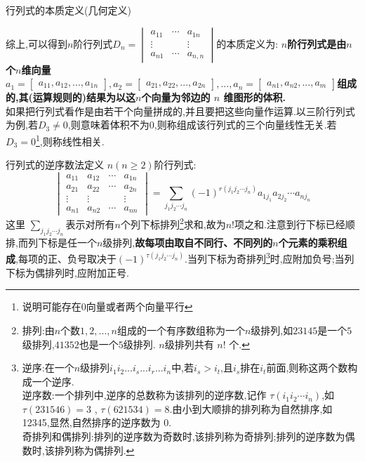 \documentclass[8pt a4paper, oneside, UTF8]{ctexbook}
\begin{document}
\begin{sloppypar}
\begin{defn}{行列式的本质定义(几何定义)}{}
\begin{center}
    \end{center}
    综上,可以得到$n$阶行列式$D_n=
    \begin{vmatrix}
        a_{11} & \cdots &a_{1n}\\ 
        \vdots &        & \vdots\\
        a_{n1} & \cdots & a_{n,n}
    \end{vmatrix}$的本质定义为:
    \textbf{$n$阶行列式是由$n$个$n$维向量$a_1=\begin{bmatrix}a_{11},a_{12},...,a_{1n}\end{bmatrix},a_2=\begin{bmatrix}a_{21},a_{22},...,a_{2n}\end{bmatrix},...,a_n=\begin{bmatrix}a_{n1},a_{n2},...,a_m\end{bmatrix}$组成的,其(运算规则的)结果为以这$n$个向量为邻边的 $n$ 维图形的体积.}\\
    如果把行列式看作是由若干个向量拼成的,并且要把这些向量作运算.以三阶行列式为例,若$D_3 \neq 0$,则意味着体积不为0,则称组成该行列式的三个向量线性无关.若$D_3 =0$\footnote{说明可能存在0向量或者两个向量平行},则称线性相关.
    \end{defn}
    \begin{defn}{行列式的逆序数法定义}{}
    $n(n\geqslant2)$阶行列式:$$\begin{vmatrix}a_{11}&a_{12}&\cdots&a_{1n}\\a_{21}&a_{22}&\cdots&a_{2n}\\\vdots&\vdots&&\vdots\\a_{n1}&a_{n2}&\cdots&a_{nn}\end{vmatrix}=\sum_{j_{1}j_{2}\cdots j_{n}}(-1)^{r(j_{1}j_{2}\cdots j_{n})}a_{1j_{1}}a_{2j_{2}}\cdots a_{nj_{n}}$$
    这里 $\sum_{j_1j_2\cdots j_n} $表示对所有$n$个列下标排列\footnote{排列:由$n$个数$1,2,...,n$组成的一个有序数组称为一个$n$级排列,如$23145$是一个$5$级排列,$41352$也是一个$5$级排列. $n$级排列共有 $n!$ 个.}求和,故为$n!$项之和.注意到行下标已经顺排,而列下标是任一个$n$级排列,\textbf{故每项由取自不同行、不同列的$n$个元素的乘积组成},每项的正、负号取决于$(-1)^{\tau(j_1j_2\cdots j_n)}$.当列下标为奇排列\footnote{逆序:在一个$n$级排列$i_1i_2...i_s...i_r...i_n$中,若$i_s>i_t$,且$i_{s}$排在$i_{t}$前面,则称这两个数构成一个逆序.\\逆序数:一个排列中,逆序的总数称为该排列的逆序数,记作 $\tau(i_1i_2\cdots i_n)$,如 $\tau(231546)=3$ , $\tau(621534)=8$.由小到大顺排的排列称为自然排序,如 12345,显然,自然排序的逆序数为 0.\\奇排列和偶排列:排列的逆序数为奇数时,该排列称为奇排列;排列的逆序数为偶数时,该排列称为偶排列.}时,应附加负号;当列下标为偶排列时,应附加正号.

\end{defn}
\end{sloppypar}
\end{document}
